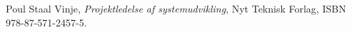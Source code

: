\begin{thebibliography}{9}
	Poul Staal Vinje,
	\emph{Projektledelse af systemudvikling},
	Nyt Teknisk Forlag,
	ISBN 978-87-571-2457-5.
\end{thebibliography}


